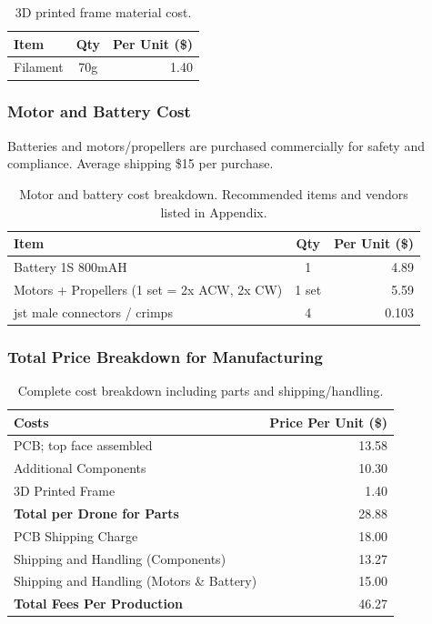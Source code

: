 \begin{table}[H]
\centering
\begin{tabular}{l c r}
\toprule
\textbf{Item} & \textbf{Qty} & \textbf{Per Unit (\$)} \\
\midrule
Filament & 70g & 1.40 \\
\bottomrule
\end{tabular}
\caption{3D printed frame material cost.}
\end{table}

\subsubsection{Motor and Battery Cost}

Batteries and motors/propellers are purchased commercially for safety and compliance. Average shipping \$15 per purchase.

\begin{table}[H]
\centering
\begin{tabular}{l c r}
\toprule
\textbf{Item} & \textbf{Qty} & \textbf{Per Unit (\$)} \\
\midrule
Battery 1S 800mAH & 1 & 4.89 \\
Motors + Propellers (1 set = 2x ACW, 2x CW) & 1 set & 5.59 \\
\gls{jst} male connectors / crimps & 4 & 0.103 \\
\bottomrule
\end{tabular}
\caption{Motor and battery cost breakdown. Recommended items and vendors listed in Appendix.}
\end{table}

\subsubsection{Total Price Breakdown for Manufacturing}

\begin{table}[H]
\centering
\begin{tabular}{l r}
\toprule
\textbf{Costs} & \textbf{Price Per Unit (\$)} \\
\midrule
PCB; top face assembled & 13.58 \\
Additional Components & 10.30 \\
3D Printed Frame & 1.40 \\
\midrule
\textbf{Total per Drone for Parts} & 28.88 \\
PCB Shipping Charge & 18.00 \\
Shipping and Handling (Components) & 13.27 \\
Shipping and Handling (Motors \& Battery) & 15.00 \\
\midrule
\textbf{Total Fees Per Production} & 46.27 \\
\bottomrule
\end{tabular}
\caption{Complete cost breakdown including parts and shipping/handling.}
\end{table}

